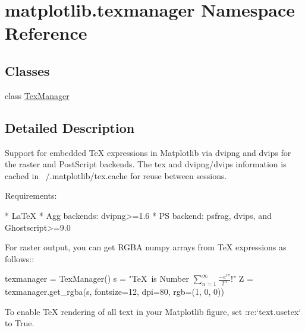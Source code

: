 \hypertarget{namespacematplotlib_1_1texmanager}{}\section{matplotlib.\+texmanager Namespace Reference}
\label{namespacematplotlib_1_1texmanager}
\subsection*{Classes}
\begin{DoxyCompactItemize}
\item 
class \hyperlink{classmatplotlib_1_1texmanager_1_1TexManager}{Tex\+Manager}
\end{DoxyCompactItemize}


\subsection{Detailed Description}
\begin{DoxyVerb}Support for embedded TeX expressions in Matplotlib via dvipng and dvips for the
raster and PostScript backends.  The tex and dvipng/dvips information is cached
in ~/.matplotlib/tex.cache for reuse between sessions.

Requirements:

* LaTeX
* \*Agg backends: dvipng>=1.6
* PS backend: psfrag, dvips, and Ghostscript>=9.0

For raster output, you can get RGBA numpy arrays from TeX expressions
as follows::

  texmanager = TexManager()
  s = "\TeX\ is Number $\displaystyle\sum_{n=1}^\infty\frac{-e^{i\pi}}{2^n}$!"
  Z = texmanager.get_rgba(s, fontsize=12, dpi=80, rgb=(1, 0, 0))

To enable TeX rendering of all text in your Matplotlib figure, set
:rc:`text.usetex` to True.
\end{DoxyVerb}
 